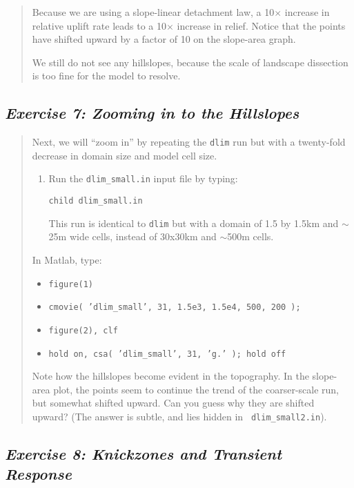 \documentclass[12pt,reqno]{amsart}
\begin{document}
\begin{quote}
{Because we are using a slope-linear detachment law, a 10$\times$ increase in relative uplift rate leads to a 10$\times$ increase in relief. Notice that the points have shifted upward by a factor of 10 on the slope-area graph.

We still do not see any hillslopes, because the scale of landscape
dissection is too fine for the model to resolve. 
}
\end{quote}

\subsection*{\em Exercise 7: Zooming in to the Hillslopes}

\begin{quote}
\small
{\sf
Next, we will ``zoom in'' by repeating the {\tt dlim} run but with a twenty-fold decrease
in domain size and model cell size.

\begin{enumerate}
\item
Run the {\tt dlim\_small.in} input file by typing:

{\tt child dlim\_small.in}

This run is identical to {\tt dlim} but with a domain of 1.5 by 1.5km
and $\sim$25m wide cells, instead of 30x30km and $\sim$500m cells.
\end{enumerate}

\noindent 
In Matlab, type:
\begin{itemize}
\setcounter{enumi}{1}
\item
{\tt figure(1)}
\item
{\tt cmovie( 'dlim\_small', 31, 1.5e3, 1.5e4, 500, 200 );}
\item
{\tt figure(2), clf}
\item
{\tt hold on, csa( 'dlim\_small', 31, 'g.' ); hold off}
\end{itemize}

Note how the hillslopes become evident in the topography. In the
slope-area plot, the points seem to continue the trend of the
coarser-scale run, but somewhat shifted upward. Can you guess why they
are shifted upward? (The answer is subtle, and lies hidden in {\tt
  dlim\_small2.in}).
}
\end{quote}

\subsection*{\em Exercise 8: Knickzones and Transient Response}
\end{document}
